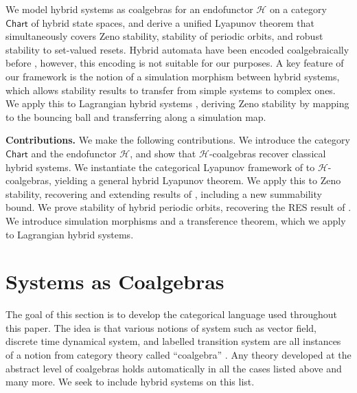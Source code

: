 \documentclass[letterpaper, 10 pt, conference]{IEEEconf}
\newcommand{\subsect}[1]{\vspace{0.5em}\noindent\textbf{#1.}}
\theoremstyle{definition}
\newcommand{\namedcat}[1]{\mathsf{#1}}
\newcommand{\Chart}{\namedcat{Chart}}
\newcommand{\functor}[1]{\mathcal{#1}}
\renewcommand{\H}{\functor{H}}
\begin{document}
We model hybrid systems as coalgebras for an endofunctor $\H$ on a category $\Chart$ of hybrid state spaces, and derive a unified Lyapunov theorem that simultaneously covers Zeno stability, stability of periodic orbits, and robust stability to set-valued resets. Hybrid automata \cite{alur1991hybrid} have been encoded coalgebraically before \cite{HybridAutomataCoalgebras}, however, this encoding is not suitable for our purposes. A key feature of our framework is the notion of a simulation morphism between hybrid systems, which allows stability results to transfer from simple systems to complex ones. We apply this to Lagrangian hybrid systems \cite{NonsmoothMechanics}, deriving Zeno stability by mapping to the bouncing ball and transferring along a simulation map.

\subsect{Contributions} We make the following contributions.
We introduce the category $\Chart$ and the endofunctor $\H$, and show that $\H$-coalgebras recover classical hybrid systems.
We instantiate the categorical Lyapunov framework of \cite{CLT1, CLT2} to $\H$-coalgebras, yielding a general hybrid Lyapunov theorem.
We apply this to Zeno stability, recovering and extending results of \cite{lamperski2012lyapunov, GoebelTeel08, ames2006stability}, including a new summability bound.
We prove stability of hybrid periodic orbits, recovering the RES result of \cite{RESCLF}.
We introduce simulation morphisms and a transference theorem, which we apply to Lagrangian hybrid systems.

\section{Systems as Coalgebras}
\label{sec:coalgebras}

The goal of this section is to develop the categorical language used throughout this paper. The idea is that various notions of system such as vector field, discrete time dynamical system, and labelled transition system are all instances of a notion from category theory called ``coalgebra'' \cite{rutten2000universal}. Any theory developed at the abstract level of coalgebras holds automatically in all the cases listed above and many more. We seek to include hybrid systems on this list. 
\end{document}
